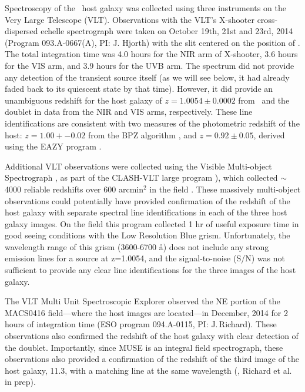 Spectroscopy of the \spock\ host galaxy was collected using three
instruments on the Very Large Telescope (VLT).  Observations with the
VLT's X-shooter cross-dispersed echelle spectrograph
\citep{Vernet:2011} were taken on October 19th, 21st and 23rd, 2014
(Program 093.A-0667(A), PI: J. Hjorth) with the slit centered on the
position of .  The total integration time was 4.0 hours for the
NIR arm of X-shooter, 3.6 hours for the VIS arm, and 3.9 hours for the
UVB arm.  The spectrum did not provide any detection of the transient
source itself (as we will see below, it had already faded back to its
quiescent state by that time).  However, it did provide an unambiguous
redshift for the host galaxy of $z=1.0054\pm0.0002$ from \Ha\ and the
 doublet in data from the NIR and VIS arms,
respectively.  These line identifications are consistent with two
measures of the photometric redshift of the host: $z=1.00+-0.02$ from
the BPZ algorithm \citep{Benitez:2000}, and $z=0.92\pm0.05$, derived
using the EAZY program \citep{Brammer:2008}.

Additional VLT observations were collected using the Visible
Multi-object Spectrograph \citep[VIMOS][]{LeFevre:2003}, as part of
the CLASH-VLT large program \citep[Program 186.A-0.798; P.I.:
  P. Rosati;][]{Rosati:2014}), which collected $\sim$4000 reliable
redshifts over 600 arcmin$^2$ in the  field
\citep{Grillo:2015a,Balestra:2015}.  These massively multi-object
observations could potentially have provided confirmation of the
redshift of the \spock host galaxy with separate spectral line
identifications in each of the three host galaxy images.  On the
 field this program collected 1 hr of useful exposure time in
good seeing conditions with the Low Resolution Blue grism.
Unfortunately, the wavelength range of this grism (3600-6700 \aa) does
not include any strong emission lines for a source at z=1.0054, and
the signal-to-noise (S/N) was not sufficient to provide any clear line
identifications for the three images of the \spock host galaxy.

The VLT Multi Unit Spectroscopic Explorer
\citep[MUSE;][]{Henault:2003,Bacon:2012} observed the NE portion of
the MACS0416 field---where the \spock host images are located---in
December, 2014 for 2 hours of integration time (ESO program
094.A-0115, PI: J.\,Richard).  These observations also confirmed the
redshift of the host galaxy with clear detection of the
 doublet.  Importantly, since MUSE is an integral
field spectrograph, these observations also provided a confirmation of
the redshift of the third image of the host galaxy, 11.3, with a
matching  line at the same wavelength
(\citealt{Caminha:2016}, Richard et al. in prep).


